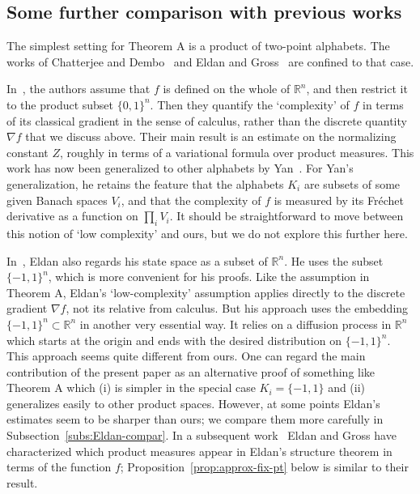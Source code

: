 \documentclass[aop,preprint]{imsart}
\theoremstyle{remark}
\newcommand{\bbR}{\mathbb{R}}
\begin{document}




\subsection*{Some further comparison with previous works}

The simplest setting for Theorem A is a product of two-point alphabets.  The works of Chatterjee and Dembo~\cite{ChaDem16} and Eldan and Gross~\cite{Eld--GWcomp,EldGro18} are confined to that case.

In~\cite{ChaDem16}, the authors assume that $f$ is defined on the whole of $\bbR^n$, and then restrict it to the product subset $\{0,1\}^n$.  Then they quantify the `complexity' of $f$ in terms of its classical gradient in the sense of calculus, rather than the discrete quantity $\nabla f$ that we discuss above.  Their main result is an estimate on the normalizing constant $Z$, roughly in terms of a variational formula over product measures.  This work has now been generalized to other alphabets by Yan~\cite{Yan--nldp}.  For Yan's generalization, he retains the feature that the alphabets $K_i$ are subsets of some given Banach spaces $V_i$, and that the complexity of $f$ is measured by its Fr\'echet derivative as a function on $\prod_i V_i$.  It should be straightforward to move between this notion of `low complexity' and ours, but we do not explore this further here.

In~\cite{Eld--GWcomp}, Eldan also regards his state space as a subset of $\bbR^n$. He uses the subset $\{-1,1\}^n$, which is more convenient for his proofs.  Like the assumption in Theorem A, Eldan's `low-complexity' assumption applies directly to the discrete gradient $\nabla f$, not its relative from calculus.  But his approach uses the embedding $\{-1,1\}^n \subset \bbR^n$ in another very essential way.  It relies on a diffusion process in $\bbR^n$ which starts at the origin and ends with the desired distribution on $\{-1,1\}^n$.  This approach seems quite different from ours.  One can regard the main contribution of the present paper as an alternative proof of something like Theorem A which (i) is simpler in the special case $K_i = \{-1,1\}$ and (ii) generalizes easily to other product spaces.  However, at some points Eldan's estimates seem to be sharper than ours; we compare them more carefully in Subsection~\ref{subs:Eldan-compar}.  In a subsequent work~\cite{EldGro18} Eldan and Gross have characterized which product measures appear in Eldan's structure theorem in terms of the function $f$; Proposition~\ref{prop:approx-fix-pt} below is similar to their result.
\end{document}
